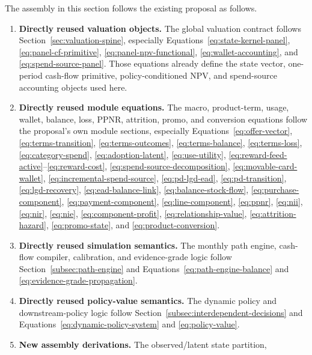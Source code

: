 \documentclass[11pt]{article}
\newcommand{\1}{\mathbf{1}}
\begin{document}
The assembly in this section follows the existing proposal as follows.
\begin{enumerate}[label=\arabic*.]
  \item \textbf{Directly reused valuation objects.} The global valuation contract
        follows Section~\ref{sec:valuation-spine}, especially
        Equations~\eqref{eq:state-kernel-panel},
        \eqref{eq:panel-cf-primitive},
        \eqref{eq:panel-npv-functional},
        \eqref{eq:wallet-accounting}, and
        \eqref{eq:spend-source-panel}. Those equations already define the state
        vector, one-period cash-flow primitive, policy-conditioned NPV, and
        spend-source accounting objects used here.
  \item \textbf{Directly reused module equations.} The macro, product-term,
        usage, wallet, balance, loss, PPNR, attrition, promo, and conversion
        equations follow the proposal's own module sections, especially
        Equations~\eqref{eq:offer-vector}, \eqref{eq:terms-transition},
        \eqref{eq:terms-outcomes}, \eqref{eq:terms-balance},
        \eqref{eq:terms-loss}, \eqref{eq:category-spend},
        \eqref{eq:adoption-latent}, \eqref{eq:use-utility},
        \eqref{eq:reward-feed-active}--\eqref{eq:reward-cost},
        \eqref{eq:spend-source-decomposition},
        \eqref{eq:movable-card-wallet},
        \eqref{eq:incremental-spend-source}, \eqref{eq:pd-lgd-ead},
        \eqref{eq:pd-transition}, \eqref{eq:lgd-recovery},
        \eqref{eq:ead-balance-link}, \eqref{eq:balance-stock-flow},
        \eqref{eq:purchase-component}, \eqref{eq:payment-component},
        \eqref{eq:line-component}, \eqref{eq:ppnr}, \eqref{eq:nii},
        \eqref{eq:nir}, \eqref{eq:nie}, \eqref{eq:component-profit},
        \eqref{eq:relationship-value}, \eqref{eq:attrition-hazard},
        \eqref{eq:promo-state}, and \eqref{eq:product-conversion}.
  \item \textbf{Directly reused simulation semantics.} The monthly path engine,
        cash-flow compiler, calibration, and evidence-grade logic follow
        Section~\ref{subsec:path-engine} and
        Equations~\eqref{eq:path-engine-balance} and
        \eqref{eq:evidence-grade-propagation}.
  \item \textbf{Directly reused policy-value semantics.} The dynamic policy and
        downstream-policy logic follow Section~\ref{subsec:interdependent-decisions}
        and Equations~\eqref{eq:dynamic-policy-system} and
        \eqref{eq:policy-value}.
  \item \textbf{New assembly derivations.} The observed/latent state partition,

\end{enumerate}
\end{document}
